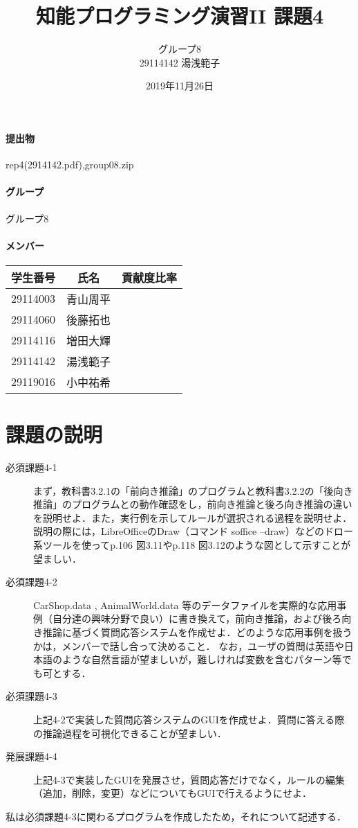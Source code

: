 \documentclass[12pt]{jarticle}
\title{知能プログラミング演習II 課題4}
\author{グループ8\\
  29114142 湯浅範子\\
}
\date{2019年11月26日}
\begin{document}
\maketitle

\paragraph{提出物} rep4(2914142.pdf),group08.zip
\paragraph{グループ} グループ8
\paragraph{メンバー}
\begin{tabular}{|c|c|c|}
  \hline
  学生番号&氏名&貢献度比率\\
  \hline\hline
  29114003&青山周平&\\
  \hline
  29114060&後藤拓也&\\
  \hline
  29114116&増田大輝&\\
  \hline
  29114142&湯浅範子&\\
  \hline
  29119016&小中祐希&\\
  \hline
\end{tabular}

\section{課題の説明}
\begin{description}
\item[必須課題4-1] まず，教科書3.2.1の「前向き推論」のプログラムと教科書3.2.2の「後向き推論」のプログラムとの動作確認をし，前向き推論と後ろ向き推論の違いを説明せよ．また，実行例を示してルールが選択される過程を説明せよ．説明の際には，LibreOfficeのDraw（コマンド soffice --draw）などのドロー系ツールを使ってp.106 図3.11やp.118 図3.12のような図として示すことが望ましい．
\item[必須課題4-2] CarShop.data , AnimalWorld.data 等のデータファイルを実際的な応用事例（自分達の興味分野で良い）に書き換えて，前向き推論，および後ろ向き推論に基づく質問応答システムを作成せよ．どのような応用事例を扱うかは，メンバーで話し合って決めること．
なお，ユーザの質問は英語や日本語のような自然言語が望ましいが，難しければ変数を含むパターン等でも可とする．
\item[必須課題4-3] 上記4-2で実装した質問応答システムのGUIを作成せよ．質問に答える際の推論過程を可視化できることが望ましい．
\item[発展課題4-4] 上記4-3で実装したGUIを発展させ，質問応答だけでなく，ルールの編集（追加，削除，変更）などについてもGUIで行えるようにせよ．
\end{description}
私は必須課題4-3に関わるプログラムを作成したため，それについて記述する．
\end{document}
